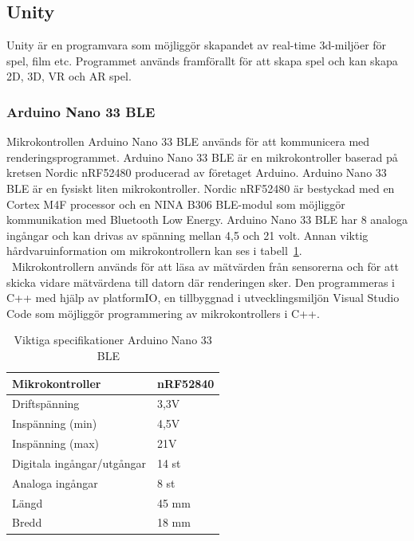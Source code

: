 \documentclass[a4paper]{article}
\begin{document}
\begin{sloppypar}
  \subsection{Unity}
  Unity är en programvara som möjliggör skapandet av real-time 3d-miljöer för spel, film etc. Programmet används framförallt för att skapa spel och kan skapa 2D, 3D, VR och AR spel.~\cite{Unity}

  \subsubsection{Arduino Nano 33 BLE}

  Mikrokontrollen Arduino Nano 33 BLE används för att kommunicera med renderingsprogrammet.
  Arduino Nano 33 BLE är en mikrokontroller baserad på kretsen Nordic nRF52480 producerad av företaget Arduino.
  Arduino Nano 33 BLE är en fysiskt liten mikrokontroller. Nordic nRF52480 är bestyckad med en Cortex M4F processor
  och en NINA B306 BLE-modul som möjliggör kommunikation med Bluetooth Low Energy. Arduino Nano 33 BLE har 8 analoga
  ingångar och kan drivas av spänning mellan 4,5 och 21 volt. Annan viktig hårdvaruinformation om mikrokontrollern
  kan ses i tabell~\ref{table:ArduinoNano}. ~\cite{Arduino:ABX00030}\\\
  Mikrokontrollern används för att läsa av mätvärden från sensorerna och för att skicka vidare mätvärdena till
  datorn där renderingen sker. Den programmeras i C++ med hjälp av platformIO, en tillbyggnad i utvecklingsmiljön
  Visual Studio Code som möjliggör programmering av mikrokontrollers i C++.

  \begin{table}[h]
    \begin{center}
      \caption{Viktiga specifikationer Arduino Nano 33 BLE ~\cite{Arduino:ABX00030}}
      \label{table:ArduinoNano}
      \begin{tabular}{ | l | l | }
        \hline
        Mikrokontroller            & nRF52840 \\
        \hline
        Driftspänning              & 3,3V     \\
        \hline
        Inspänning (min)           & 4,5V     \\
        \hline
        Inspänning (max)           & 21V      \\
        \hline
        Digitala ingångar/utgångar & 14 st    \\
        \hline
        Analoga ingångar           & 8 st     \\
        \hline
        Längd                      & 45 mm    \\
        \hline
        Bredd                      & 18 mm    \\
        \hline
      \end{tabular}
    \end{center}
  \end{table}


\end{sloppypar}
\end{document}
